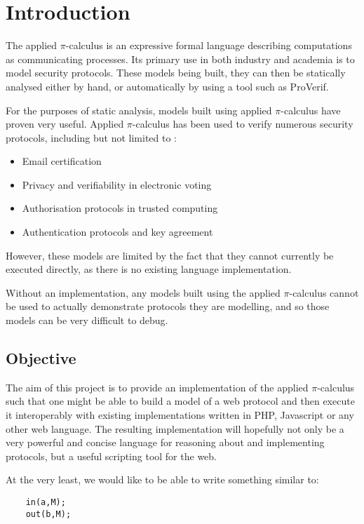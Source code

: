 \section{Introduction}

The applied $\pi$-calculus is an expressive formal language describing computations as communicating processes. Its primary use in both industry and academia is to model security protocols. These models being built, they can then be statically analysed either by hand, or automatically by using a tool such as ProVerif. 

For the purposes of static analysis, models built using applied $\pi$-calculus have proven very useful. Applied $\pi$-calculus has been used to verify numerous security protocols, including but not limited to \cite{rs13}:
\begin{itemize}
    \item Email certification
    \item Privacy and verifiability in electronic voting
    \item Authorisation protocols in trusted computing
    \item Authentication protocols and key agreement
\end{itemize} 
However, these models are limited by the fact that they cannot currently be executed directly, as there is no existing language implementation. 

Without an implementation, any models built using the applied $\pi$-calculus cannot be used to actually demonstrate protocols they are modelling, and so those models can be very difficult to debug.

\subsection{Objective}

The aim of this project is to provide an implementation of the applied $\pi$-calculus such that one might be able to build a model of a web protocol and then execute it interoperably with existing implementations written in PHP, Javascript or any other web language. The resulting implementation will hopefully not only be a very powerful and concise language for reasoning about and implementing protocols, but a useful scripting tool for the web.

At the very least, we would like to be able to write something similar to:
    
\begin{verbatim}
    in(a,M); 
    out(b,M);
\end{verbatim}

